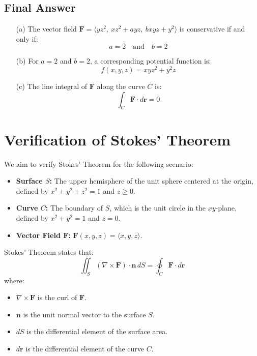 \documentclass[11pt]{article}
\begin{document}
\newpage

\subsection{Final Answer}

\begin{enumerate}
    \item[(a)] The vector field \( \mathbf{F} = \langle y z^2, \ x z^2 + a y z, \ b x y z + y^2 \rangle \) is conservative if and only if:
    \[
    \boxed{ a = 2 \quad \text{and} \quad b = 2 }
    \]
    
    \item[(b)] For \( a = 2 \) and \( b = 2 \), a corresponding potential function is:
    \[
    \boxed{ f(x, y, z) = x y z^2 + y^2 z }
    \]
    
    \item[(c)] The line integral of \( \mathbf{F} \) along the curve \( C \) is:
    \[
    \boxed{ \int_{C} \mathbf{F} \cdot d\mathbf{r} = 0 }
    \]
\end{enumerate}




\newpage

\section{Verification of Stokes' Theorem}

We aim to verify Stokes' Theorem for the following scenario:

\begin{itemize}
    \item \textbf{Surface \( S \):} The upper hemisphere of the unit sphere centered at the origin, defined by \( x^2 + y^2 + z^2 = 1 \) and \( z \geq 0 \).
    \item \textbf{Curve \( C \):} The boundary of \( S \), which is the unit circle in the \( xy \)-plane, defined by \( x^2 + y^2 = 1 \) and \( z = 0 \).
    \item \textbf{Vector Field \( \mathbf{F} \):} \( \mathbf{F}(x, y, z) = \langle x, y, z \rangle \).
\end{itemize}

Stokes' Theorem states that:
\[
\iint_{S} (\nabla \times \mathbf{F}) \cdot \mathbf{n} \, dS = \oint_{C} \mathbf{F} \cdot d\mathbf{r}
\]
where:
\begin{itemize}
    \item \( \nabla \times \mathbf{F} \) is the curl of \( \mathbf{F} \).
    \item \( \mathbf{n} \) is the unit normal vector to the surface \( S \).
    \item \( dS \) is the differential element of the surface area.
    \item \( d\mathbf{r} \) is the differential element of the curve \( C \).
\end{itemize}
\end{document}
